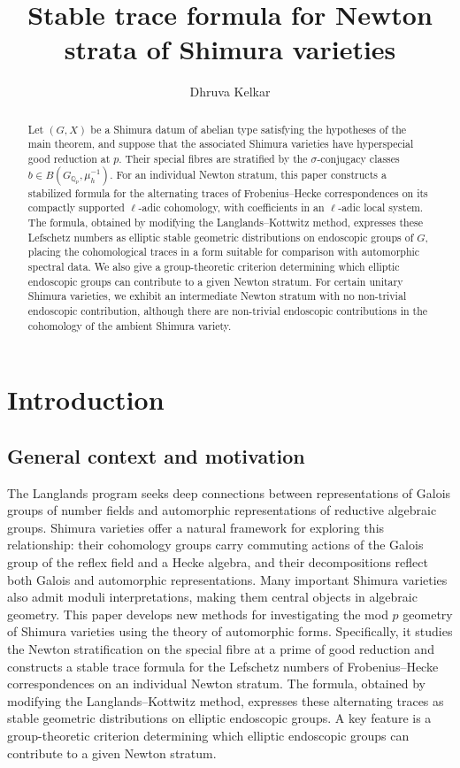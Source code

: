 \documentclass[11pt,a4paper]{article}
\title{Stable trace formula for Newton strata of Shimura varieties}
\author{Dhruva Kelkar}
\date{}
\theoremstyle{definition}
\theoremstyle{plain}
\theoremstyle{remark}
\theoremstyle{plain}
\begin{document}
\maketitle

\begin{abstract}
    \noindent Let $(G,X)$ be a Shimura datum of abelian type satisfying the hypotheses of the main theorem, and suppose that the associated Shimura varieties have hyperspecial good reduction at $p$. Their special fibres are stratified by the $\sigma$-conjugacy classes $b\in B(G_{\mathbb{Q}_p},\mu_h^{-1})$. For an individual Newton stratum, this paper constructs a stabilized formula for the alternating traces of Frobenius--Hecke correspondences on its compactly supported $\ell$-adic cohomology, with coefficients in an $\ell$-adic local system. The formula, obtained by modifying the Langlands--Kottwitz method, expresses these Lefschetz numbers as elliptic stable geometric distributions on endoscopic groups of $G$, placing the cohomological traces in a form suitable for comparison with automorphic spectral data. We also give a group-theoretic criterion determining which elliptic endoscopic groups can contribute to a given Newton stratum. For certain unitary Shimura varieties, we exhibit an intermediate Newton stratum with no non-trivial endoscopic contribution, although there are non-trivial endoscopic contributions in the cohomology of the ambient Shimura variety.
\end{abstract}

\setcounter{tocdepth}{2}
\tableofcontents

\section{Introduction}
\subsection{General context and motivation}\label{informalintro}
The Langlands program seeks deep connections between representations of Galois groups of number fields and automorphic representations of reductive algebraic groups. Shimura varieties offer a natural framework for exploring this relationship: their cohomology groups carry commuting actions of the Galois group of the reflex field and a Hecke algebra, and their decompositions reflect both Galois and automorphic representations. Many important Shimura varieties also admit moduli interpretations, making them central objects in algebraic geometry. This paper develops new methods for investigating the mod $p$ geometry of Shimura varieties using the theory of automorphic forms. Specifically, it studies the Newton stratification on the special fibre at a prime of good reduction and constructs a stable trace formula for the Lefschetz numbers of Frobenius--Hecke correspondences on an individual Newton stratum. The formula, obtained by modifying the Langlands--Kottwitz method, expresses these alternating traces as stable geometric distributions on elliptic endoscopic groups. A key feature is a group-theoretic criterion determining which elliptic endoscopic groups can contribute to a given Newton stratum.
\end{document}
